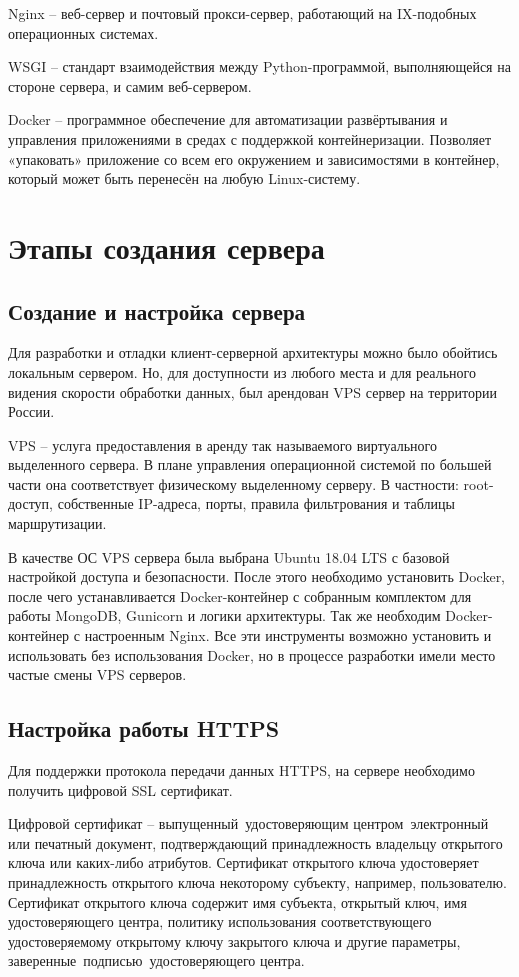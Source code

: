 \documentclass[14pt, a4paper]{extarticle}
\begin{document}
    Nginx – веб-сервер и почтовый прокси-сервер, работающий на IX-подобных операционных системах.

    WSGI – стандарт взаимодействия между Python-программой, выполняющейся на стороне сервера, и самим веб-сервером.

    Docker – программное обеспечение для автоматизации развёртывания и управления приложениями в средах с поддержкой контейнеризации. Позволяет «упаковать» приложение со всем его окружением и зависимостями в контейнер, который может быть перенесён на любую Linux-систему.


    \newpage
    \section{Этапы создания сервера}
    \subsection{Создание и настройка сервера}
    Для разработки и отладки клиент-серверной архитектуры можно было обойтись локальным сервером. Но, для доступности из любого места и для реального видения скорости обработки данных, был арендован VPS сервер на территории России.

    VPS – услуга предоставления в аренду так называемого виртуального выделенного сервера. В плане управления операционной системой по большей части она соответствует физическому выделенному серверу. В частности: root-доступ, собственные IP-адреса, порты, правила фильтрования и таблицы маршрутизации.

    В качестве ОС VPS сервера была выбрана Ubuntu 18.04 LTS с базовой настройкой доступа и безопасности. После этого необходимо установить Docker, после чего устанавливается Docker-контейнер с собранным комплектом для работы MongoDB, Gunicorn и логики архитектуры. Так же необходим Docker-контейнер с настроенным Nginx. Все эти инструменты возможно установить и использовать без использования Docker, но в процессе разработки имели место частые смены VPS серверов.


    \newpage
    \subsection{Настройка работы HTTPS}
    Для поддержки протокола передачи данных HTTPS, на сервере необходимо получить цифровой SSL сертификат.

    Цифровой сертификат – выпущенный удостоверяющим центром электронный или печатный документ, подтверждающий принадлежность владельцу открытого ключа или каких-либо атрибутов. Сертификат открытого ключа удостоверяет принадлежность открытого ключа некоторому субъекту, например, пользователю. Сертификат открытого ключа содержит имя субъекта, открытый ключ, имя удостоверяющего центра, политику использования соответствующего удостоверяемому открытому ключу закрытого ключа и другие параметры, заверенные подписью удостоверяющего центра.
\end{document}
